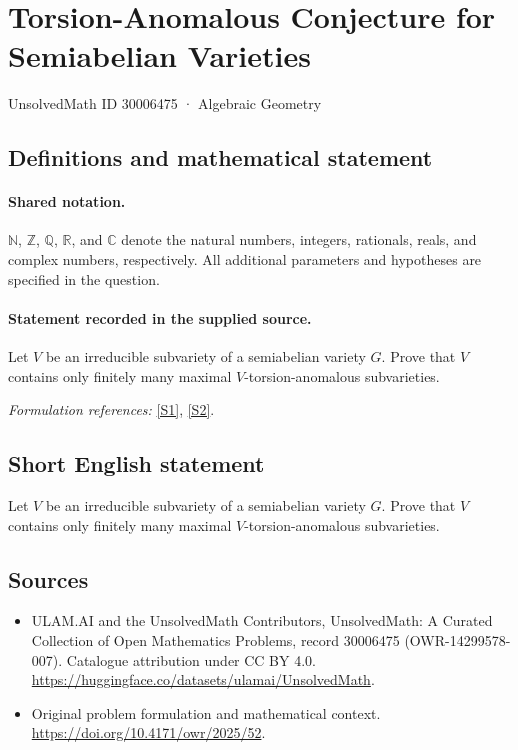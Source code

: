 \documentclass[11pt]{article}
\newcommand{\sref}[2]{\hyperlink{source:#1:#2}{[S#2]}}
\begin{document}
\setcounter{section}{30006474}
\section{Torsion-Anomalous Conjecture for Semiabelian Varieties}\label{30006475}
{\small UnsolvedMath ID 30006475 · Algebraic Geometry}
\subsection{Definitions and mathematical statement}

\paragraph{Shared notation.}$\mathbb N$, $\mathbb Z$, $\mathbb Q$, $\mathbb R$, and $\mathbb C$ denote the natural numbers, integers, rationals, reals, and complex numbers, respectively. All additional parameters and hypotheses are specified in the question.


\paragraph{Statement recorded in the supplied source.}
Let $V$ be an irreducible subvariety of a semiabelian variety $G$. Prove that $V$ contains only finitely many maximal $V$-torsion-anomalous subvarieties.
\par\smallskip\textit{Formulation references:} \sref{30006475}{1}, \sref{30006475}{2}.
\subsection{Short English statement}
Let $V$ be an irreducible subvariety of a semiabelian variety $G$. Prove that $V$ contains only finitely many maximal $V$-torsion-anomalous subvarieties.
\subsection{Sources}
\begin{itemize}
\item[\hypertarget{source:30006475:1}{S1}] ULAM.AI and the UnsolvedMath Contributors, UnsolvedMath: A Curated Collection of Open Mathematics Problems, record 30006475 (OWR-14299578-007). Catalogue attribution under CC BY 4.0.
\url{https://huggingface.co/datasets/ulamai/UnsolvedMath}.
\item[\hypertarget{source:30006475:2}{S2}] Original problem formulation and mathematical context.
\url{https://doi.org/10.4171/owr/2025/52}.
\end{itemize}
\label{end:30006475}
\end{document}
